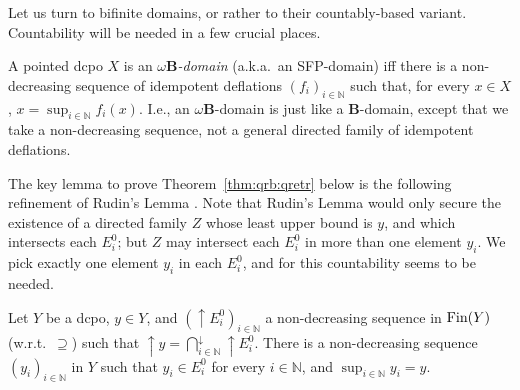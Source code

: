 \documentclass{LMCS}
\newcommand\nat{\mathbb{N}}
\newcommand\upc{\mathop{\uparrow}\nolimits}
\newcommand\B{\mathbf{B}}
\begin{document}
Let us turn to bifinite domains, or rather to their countably-based
variant.  Countability will be needed in a few crucial places.

A pointed dcpo $X$ is an {\em $\omega\B$-domain\/} (a.k.a.\ an
SFP-domain) iff there is a non-decreasing sequence of idempotent
deflations ${(f_i)}_{i \in \nat}$ such that, for every $x \in X$, $x =
\sup_{i \in \nat} f_i (x)$.  I.e., an $\omega\B$-domain is just like a
$\B$-domain, except that we take a non-decreasing sequence, not a
general directed family of idempotent deflations.





The key lemma to prove Theorem~\ref{thm:qrb:qretr} below is the
following refinement of Rudin's Lemma \cite[III-3.3]{GHKLMS:contlatt}.
Note that Rudin's Lemma would only secure the existence of a directed
family $Z$ whose least upper bound is $y$, and which intersects each
$E^0_i$; but $Z$ may intersect each $E^0_i$ in more than one element
$y_i$.  We pick exactly one element $y_i$ in each $E^0_i$, and for
this countability seems to be needed.
\begin{lem}
  \label{lemma:qs:nonempty}
  Let $Y$ be a dcpo, $y \in Y$, and ${(\upc E^0_i)}_{i \in \nat}$ a
  non-decreasing sequence in $\mathop{\text{Fin}} (Y)$ (w.r.t.\ $\supseteq$) such that $\upc y = \bigcap_{i
    \in \nat}^\downarrow \upc E^0_i$.
There is a non-decreasing sequence ${(y_i)}_{i \in \nat}$ in $Y$
  such that $y_i \in E^0_i $ for every $i \in \nat$, and $\sup_{i \in \nat} y_i = y$.
\end{lem}
\end{document}
